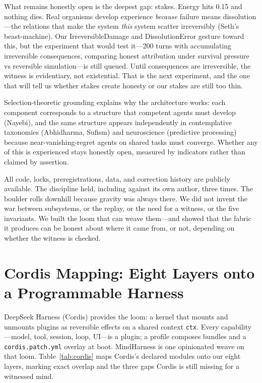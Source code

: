 \documentclass[11pt]{article}
\begin{document}
What remains honestly open is the deepest gap: stakes. Energy hits
0.15 and nothing dies. Real organisms develop experience \emph{because}
failure means dissolution---the relations that make the system \emph{this}
system scatter irreversibly (Seth's beast-machine). Our
IrreversibleDamage and DissolutionError gesture toward this, but the
experiment that would test it---200 turns with accumulating irreversible
consequences, comparing honest attribution under survival pressure vs
reversible simulation---is still queued. Until consequences are
irreversible, the witness is evidentiary, not existential. That is the
next experiment, and the one that will tell us whether stakes create
honesty or our stakes are still too thin.

Selection-theoretic grounding explains why the architecture works: each
component corresponds to a structure that competent agents must develop
(Nayebi), and the same structure appears independently in contemplative
taxonomies (Abhidharma, Sufism) and neuroscience (predictive
processing) because near-vanishing-regret agents on shared tasks must
converge. Whether any of this is experienced stays honestly open,
measured by indicators rather than claimed by assertion.

All code, locks, preregistrations, data, and correction history are
publicly available. The discipline held, including against its own
author, three times. The boulder rolls downhill because gravity was
always there. We did not invent the war between subsystems, or the
replay, or the need for a witness, or the five invariants. We built the
loom that can weave them---and showed that the fabric it produces can
be honest about where it came from, or not, depending on whether the
witness is checked.

\appendix
\section{Cordis Mapping: Eight Layers onto a Programmable Harness}
\label{app:cordis}

DeepSeek Harness (Cordis) provides the loom: a kernel that mounts and
unmounts plugins as reversible effects on a shared context \texttt{ctx}.
Every capability---model, tool, session, loop, UI---is a plugin; a
profile composes bundles and a \texttt{cordis.patch.yml} overlay at boot.
MindHarness is one opinionated weave on that loom. Table~\ref{tab:cordis}
maps Cordis's declared modules onto our eight layers, marking exact
overlap and the three gaps Cordis is still missing for a witnessed mind.
\end{document}
